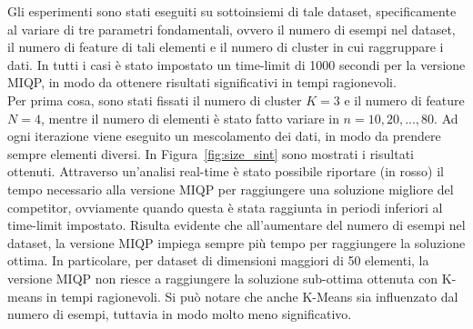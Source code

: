 \documentclass{article}
\begin{document}
    Gli esperimenti sono stati eseguiti su sottoinsiemi di tale dataset, specificamente al variare di tre parametri fondamentali, ovvero il numero di esempi nel dataset, il numero di feature di tali elementi e il numero di cluster in cui raggruppare i dati. In tutti i casi è stato impostato un time-limit di 1000 secondi per la versione MIQP, in modo da ottenere risultati significativi in tempi ragionevoli.\\
    Per prima cosa, sono stati fissati il numero di cluster $K=3$ e il numero di feature $N=4$, mentre il numero di elementi è stato fatto variare in $n=10,20,...,80$. Ad ogni iterazione viene eseguito un mescolamento dei dati, in modo da prendere sempre elementi diversi. In Figura~\ref{fig:size_sint} sono mostrati i risultati ottenuti. Attraverso un'analisi real-time è stato possibile riportare (in rosso) il tempo necessario alla versione MIQP per raggiungere una soluzione migliore del competitor, ovviamente quando questa è stata raggiunta in periodi inferiori al time-limit impostato.
    Risulta evidente che all'aumentare del numero di esempi nel dataset, la versione MIQP impiega sempre più tempo per raggiungere la soluzione ottima. In particolare, per dataset di dimensioni maggiori di 50 elementi, la versione MIQP non riesce a raggiungere la soluzione sub-ottima ottenuta con K-means in tempi ragionevoli. Si può notare che anche K-Means sia influenzato dal numero di esempi, tuttavia in modo molto meno significativo.\\
\end{document}
